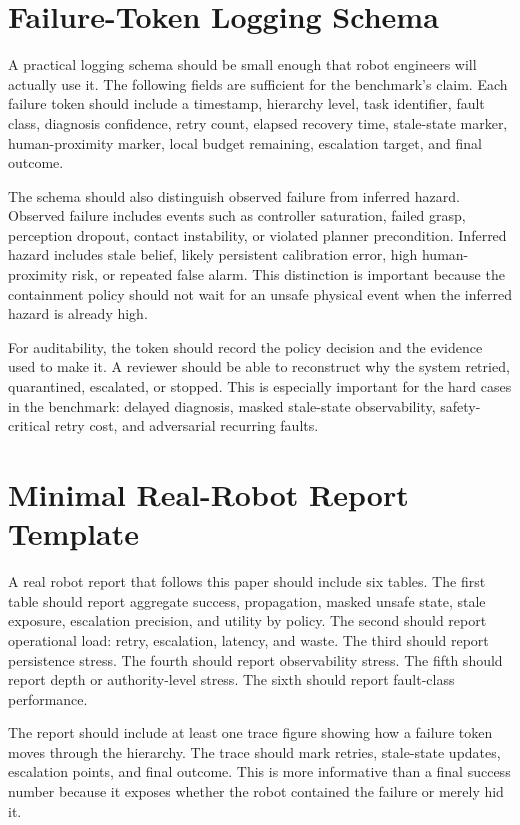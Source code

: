 \section{Failure-Token Logging Schema}

A practical logging schema should be small enough that robot engineers will actually use it. The following fields are sufficient for the benchmark's claim. Each failure token should include a timestamp, hierarchy level, task identifier, fault class, diagnosis confidence, retry count, elapsed recovery time, stale-state marker, human-proximity marker, local budget remaining, escalation target, and final outcome.

The schema should also distinguish observed failure from inferred hazard. Observed failure includes events such as controller saturation, failed grasp, perception dropout, contact instability, or violated planner precondition. Inferred hazard includes stale belief, likely persistent calibration error, high human-proximity risk, or repeated false alarm. This distinction is important because the containment policy should not wait for an unsafe physical event when the inferred hazard is already high.

For auditability, the token should record the policy decision and the evidence used to make it. A reviewer should be able to reconstruct why the system retried, quarantined, escalated, or stopped. This is especially important for the hard cases in the benchmark: delayed diagnosis, masked stale-state observability, safety-critical retry cost, and adversarial recurring faults.

\section{Minimal Real-Robot Report Template}

A real robot report that follows this paper should include six tables. The first table should report aggregate success, propagation, masked unsafe state, stale exposure, escalation precision, and utility by policy. The second should report operational load: retry, escalation, latency, and waste. The third should report persistence stress. The fourth should report observability stress. The fifth should report depth or authority-level stress. The sixth should report fault-class performance.

The report should include at least one trace figure showing how a failure token moves through the hierarchy. The trace should mark retries, stale-state updates, escalation points, and final outcome. This is more informative than a final success number because it exposes whether the robot contained the failure or merely hid it.

